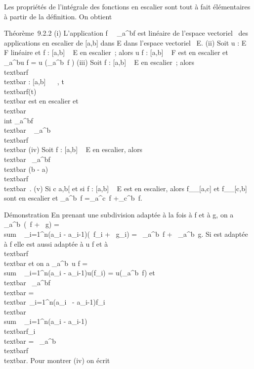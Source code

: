 \documentclass[]{article}
\begin{document}
Les propriétés de l'intégrale des fonctions en escalier sont tout à fait
élémentaires à partir de la définition. On obtient

Théorème~9.2.2 (i) L'application
f\mapsto~\int ~
\_a^bf est linéaire de l'espace vectoriel ~des applications
en escalier de {[}a,b{]} dans E dans l'espace vectoriel ~E. (ii) Soit u
: E \rightarrow~ F linéaire et f : {[}a,b{]} \rightarrow~ E en escalier~; alors u \cdot f :
{[}a,b{]} \rightarrow~ F est en escalier et \int ~
\_a^bu \cdot f = u\left
(\int  \_a^b~f\right
) (iii) Soit f : {[}a,b{]} \rightarrow~ E en escalier~; alors
\\textbar{}f\\textbar{} : {[}a,b{]} \rightarrow~ ~,
t\mapsto~\\textbar{}f(t)\\textbar{}
est en escalier et \\textbar{}\\int
 \_a^bf\\textbar{}
\leq\int ~
\_a^b\\textbar{}f\\textbar{}
(iv) Soit f : {[}a,b{]} \rightarrow~ E en escalier, alors
\\textbar{}\int ~
\_a^bf\\textbar{} \leq (b -
a)\\textbar{}f\\textbar{}\infty~. (v) Si c
\in{]}a,b{[} et si f : {[}a,b{]} \rightarrow~ E est en escalier, alors
f\_\textbar{}\_{[}a,c{]} et
f\_\textbar{}\_{[}c,b{]} sont en escalier et
\int  \_a^b~f
=\int  \_a^c~f
+\int  \_c^b~f.

Démonstration En prenant une subdivision adaptée à la fois à f et à g,
on a \int  \_a^b~(\alpha~f + \beta~g)
= \\sum ~
\_i=1^n(a\_i - a\_i-1)(\alpha~f\_i +
\beta~g\_i) = \alpha~\int  \_a^b~f +
\beta~\int  \_a^b~g. Si \sigma est adaptée à
f elle est aussi adaptée à u \cdot f et à
\\textbar{}f\\textbar{} et on a
\int  \_a^b~u \cdot f
= \\sum ~
\_i=1^n(a\_i - a\_i-1)u(f\_i) =
u(\int  \_a^b~f) et
\\textbar{}\int ~
\_a^bf\\textbar{}
=\\textbar{}\
\sum  \_i=1^n(a\_i~ -
a\_i-1)f\_i\\textbar{}
\leq\\sum ~
\_i=1^n(a\_i -
a\_i-1)\\textbar{}f\_i\\textbar{}
=\int ~
\_a^b\\textbar{}f\\textbar{}.
Pour montrer (iv) on écrit
\end{document}
